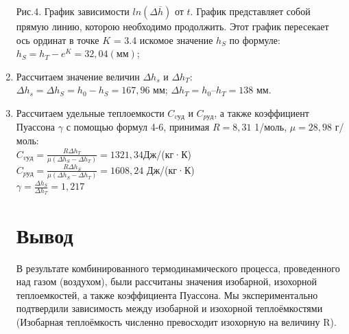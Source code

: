 \documentclass[12pt]{article}
\begin{document}
\begin{enumerate}
\par\bigskip\par\bigskip\par\bigskip\par\bigskip\par\bigskip\par\bigskip\par\bigskip\par\bigskip\par\bigskip\par\bigskip\par\bigskip\par\bigskip\par\bigskip\par\bigskip\par\bigskip\par\bigskip\par\bigskip\par\bigskip\par\bigskip\par\bigskip \par\bigskip\par\bigskip\par\bigskip\par\bigskip        
Рис.4. График зависимости $ln(\Delta \overline{h})$ от $t$.
График представляет собой прямую линию, которою необходимо продолжить. Этот график пересекает ось ординат в точке $K$ = 3.4
 искомое значение $h_{S}$ по формуле:\\
$h_{S} = h_{T} - e^{K} =  32,04 (мм)$;\\

\item Рассчитаем значение величин $\Delta h_{s}$ и $\Delta h_{T}$: \\

$\Delta h_{s}  =\Delta h_{S} = h_{0} - h_{S} =167,96$ мм;
$\Delta h_{T}  = h_{0} – h_{T} = 138$ мм.\\

\item Рассчитаем удельные теплоемкости $C_{v уд}$ и $C_{p уд}$, а также коэффициент Пуассона $\gamma$ с помощью формул 4-6, принимая $R = 8,31$ 1/моль,  $\mu = 28,98$ г/моль:\\

$C_{v уд}=\frac{R\Delta h_{T}}{\mu(\Delta h_{S}-\Delta h_{T})} 	=  1321,34 $Дж/(кг·К)	\\	
$C_{p уд}=\frac{R\Delta h_{S}}{\mu(\Delta h_{S}-\Delta h_{T})} 	= 1608,24$ Дж/(кг·К)\\
$\gamma = \frac {\Delta h_{S}}{\Delta h_{T}} 	= 1,217$

\section*{Вывод}
В результате комбинированного термодинамического процесса, проведенного над газом (воздухом), были рассчитаны значения изобарной, изохорной теплоемкостей, а также коэффициента Пуассона. Мы экспериментально подтвердили зависимость между изобарной и изохорной теплоёмкостями (Изобарная теплоёмкость численно превосходит изохорную на величину R).

\end{enumerate}
\end{document}
